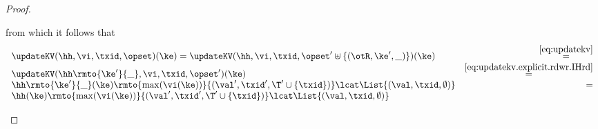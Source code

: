 \begin{proof}
\begin{enumerate}
\begin{itemize}
\begin{equation}
			\end{equation}
			from which it follows that 
			\[
			\begin{array}{lr}
			\updateKV(\hh, \vi, \txid, \opset)(\ke) = \updateKV(\hh, \vi, \txid, \opset' \uplus \{(\otR, \ke', \_)\})(\ke) &\stackrel{\eqref{eq:updatekv}}{=}\\
			\updateKV(\hh\rmto{\ke'}{\_}, \vi, \txid, \opset')(\ke) &\stackrel{\eqref{eq:updatekv.explicit.rdwr.IHrd}}{=}\\
			\hh\rmto{\ke'}{\_}(\ke)\rmto{\max(\vi(\ke))}{(\val', \txid', \T' \cup \{\txid\})} \lcat \List{(\val, \txid, \emptyset)} &=\\
			\hh(\ke)\rmto{\max(\vi(\ke))}{(\val', \txid', \T' \cup \{\txid\})} \lcat \List{(\val, \txid, \emptyset)}
			\end{array}
			\]
			

\end{itemize}
\end{enumerate}
\end{proof}
